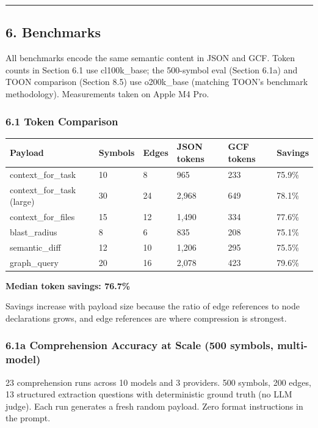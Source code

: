 \documentclass[
  11pt,
  paper=a4,
  ,captions=tableheading
]{scrartcl}
\newcounter{none} %
\begin{document}
\begin{center}\rule{0.5\linewidth}{0.5pt}\end{center}

\subsection{6. Benchmarks}\label{benchmarks}

All benchmarks encode the same semantic content in JSON and GCF. Token
counts in Section 6.1 use cl100k\_base; the 500-symbol eval (Section
6.1a) and TOON comparison (Section 8.5) use o200k\_base (matching TOON's
benchmark methodology). Measurements taken on Apple M4 Pro.

\subsubsection{6.1 Token Comparison}\label{token-comparison}

{\def\LTcaptype{none} %
\begin{longtable}[]{@{}llllll@{}}
\toprule\noalign{}
Payload & Symbols & Edges & JSON tokens & GCF tokens & Savings \\
\midrule\noalign{}
\endhead
\bottomrule\noalign{}
\endlastfoot
context\_for\_task & 10 & 8 & 965 & 233 & 75.9\% \\
context\_for\_task (large) & 30 & 24 & 2,968 & 649 & 78.1\% \\
context\_for\_files & 15 & 12 & 1,490 & 334 & 77.6\% \\
blast\_radius & 8 & 6 & 835 & 208 & 75.1\% \\
semantic\_diff & 12 & 10 & 1,206 & 295 & 75.5\% \\
graph\_query & 20 & 16 & 2,078 & 423 & 79.6\% \\
\end{longtable}
}

\textbf{Median token savings: 76.7\%}

Savings increase with payload size because the ratio of edge references
to node declarations grows, and edge references are where compression is
strongest.

\subsubsection{6.1a Comprehension Accuracy at Scale (500 symbols,
multi-model)}\label{a-comprehension-accuracy-at-scale-500-symbols-multi-model}

23 comprehension runs across 10 models and 3 providers. 500 symbols, 200
edges, 13 structured extraction questions with deterministic ground
truth (no LLM judge). Each run generates a fresh random payload. Zero
format instructions in the prompt.
\end{document}
